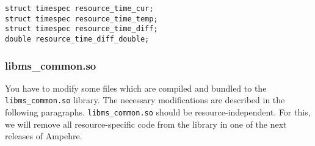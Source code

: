 \begin{lstlisting}[caption={Extensions for the \texttt{MEAUSREMENT\_INTERNAL} struct defined in \texttt{measurement.h}.}, label=lst:measurement.h_internal_struct]
struct timespec resource_time_cur;
struct timespec resource_time_temp;
struct timespec resource_time_diff;
double resource_time_diff_double;
\end{lstlisting}

\subsubsection{libms\_common.so}
You have to modify some files which are compiled and bundled to the \texttt{libms\_common.so} library. The necessary modifications are described in the following paragraphs. \texttt{libms\_common.so} should be resource-independent. For this, we will remove all resource-specific code from the library in one of the next releases of Ampehre.

